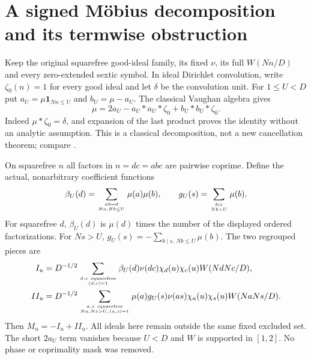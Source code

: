 \documentclass[11pt]{article}
\theoremstyle{definition}\newtheorem{definition}[theorem]{Definition}
\theoremstyle{remark}\newtheorem{remark}[theorem]{Remark}
\begin{document}
\section{A signed M\"obius decomposition and its termwise obstruction}
\label{sec:mobius-split}
Keep the original squarefree good-ideal family, its fixed $\nu$, its
full $W(Nn/D)$ and every zero-extended sextic symbol. In ideal Dirichlet
convolution, write $\zeta_0(n)=1$ for every good ideal and let $\delta$
be the convolution unit. For $1\le U<D$ put
$a_U=\mu\mathbf1_{Nn\le U}$ and $b_U=\mu-a_U$. The classical Vaughan
algebra gives
\begin{equation}\label{eq:mobius-split}
 \mu=2a_U-a_U*a_U*\zeta_0+b_U*b_U*\zeta_0.
\end{equation}
Indeed $\mu*\zeta_0=\delta$, and expansion of the last product proves the
identity without an analytic assumption. This is a classical decomposition,
not a new cancellation theorem; compare \cite[Lemma4.1]{GreenTaoVaughan}.

On squarefree $n$ all factors in $n=d c=a b c$ are pairwise coprime.
Define the actual, nonarbitrary coefficient functions
\[
 \beta_U(d)=\sum_{ab=d\atop Na,Nb\le U}\mu(a)\mu(b),\qquad
 g_U(s)=\sum_{b\mid s\atop Nb>U}\mu(b).
\]
For squarefree $d$, $\beta_U(d)$ is $\mu(d)$ times the number of the
displayed ordered factorizations. For $Ns>U$,
$g_U(s)=-\sum_{b\mid s,\,Nb\le U}\mu(b)$. The two regrouped pieces are
\begin{align*}
 I_u&=D^{-1/2}\sum_{d,c\ {\rm squarefree}\atop(d,c)=1}
  \beta_U(d)\nu(dc)\chi_d(u)\chi_c(u)W(NdNc/D),\\
 II_u&=D^{-1/2}\sum_{a,s\ {\rm squarefree}\atop Na,Ns>U,\,(a,s)=1}
  \mu(a)g_U(s)\nu(as)\chi_a(u)\chi_s(u)W(NaNs/D).
\end{align*}
Then $M_u=-I_u+II_u$. All ideals here remain outside the same fixed
excluded set. The short $2a_U$ term vanishes because $U<D$ and $W$ is
supported in $[1,2]$. No phase or coprimality mask was removed.
\end{document}
